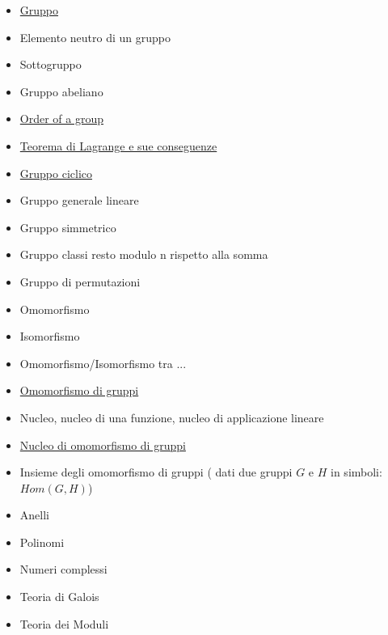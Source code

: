 \documentclass[a4paper,10pt]{article}
\begin{document}
\begin{itemize}
 \item \href{./Gruppo.html}{Gruppo}
 \item Elemento neutro di un gruppo
 \item Sottogruppo
 \item Gruppo abeliano
 \item \href{./OrderOfGroup.html}{Order of a group}
 \item \href{./TeoremaDiLagrange.html}{Teorema di Lagrange e sue conseguenze} 
 \item \href{./CyclicGroup.html}{Gruppo ciclico}
 
 \item Gruppo generale lineare
 \item Gruppo simmetrico 
 \item Gruppo classi resto modulo n rispetto alla somma
 \item Gruppo di permutazioni
 
 \item Omomorfismo
 \item Isomorfismo
 \item Omomorfismo/Isomorfismo tra ...
 \item \href{./OmomorfismoGruppi.html}{Omomorfismo di gruppi}
 \item Nucleo, nucleo di una funzione, nucleo di applicazione lineare
 \item \href{Nucleo.html}{Nucleo di omomorfismo di gruppi}
 \item Insieme degli omomorfismo di gruppi ( dati due gruppi $G$ e $H$ in simboli: $Hom(G,H)$)
 
 \item Anelli
 \item Polinomi
 \item Numeri complessi
 \item Teoria di Galois
 \item Teoria dei Moduli
\end{itemize}
\end{document}
